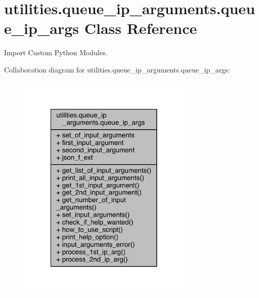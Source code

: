 \hypertarget{classutilities_1_1queue__ip__arguments_1_1queue__ip__args}{}\section{utilities.\+queue\+\_\+ip\+\_\+arguments.\+queue\+\_\+ip\+\_\+args Class Reference}
\label{classutilities_1_1queue__ip__arguments_1_1queue__ip__args}


Import Custom Python Modules.  




Collaboration diagram for utilities.\+queue\+\_\+ip\+\_\+arguments.\+queue\+\_\+ip\+\_\+args\+:
\nopagebreak
\begin{figure}[H]
\begin{center}
\leavevmode
\includegraphics[width=236pt]{d0/dae/classutilities_1_1queue__ip__arguments_1_1queue__ip__args__coll__graph}
\end{center}
\end{figure}

